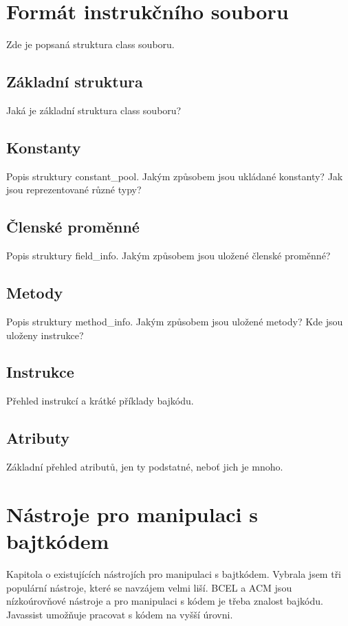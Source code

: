 \chapter{Formát instrukčního souboru}

Zde je popsaná struktura class souboru.

\section{Základní struktura}

Jaká je základní struktura class souboru?

\section{Konstanty}

Popis struktury constant\_pool. Jakým způsobem jsou ukládané konstanty? Jak jsou reprezentované různé typy?

\section{Členské proměnné}

Popis struktury field\_info. Jakým způsobem jsou uložené členské proměnné?

\section{Metody}

Popis struktury method\_info. Jakým způsobem jsou uložené metody? Kde jsou uloženy instrukce?

\section{Instrukce}

Přehled instrukcí a krátké příklady bajkódu.

\section{Atributy}

Základní přehled atributů, jen ty podstatné, neboť jich je mnoho.


\chapter{Nástroje pro manipulaci s bajtkódem}

Kapitola o existujících nástrojích pro manipulaci s bajtkódem.
Vybrala jsem tři populární nástroje, které se navzájem velmi liší.
BCEL a ACM jsou nízkoúrovňové nástroje a pro manipulaci s kódem je třeba znalost bajkódu.
Javassist umožňuje pracovat s kódem na vyšší úrovni.

